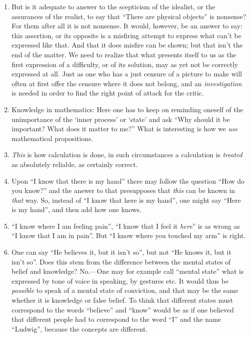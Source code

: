 \documentclass{book}
\begin{document}
\begin{enumerate}
\item
But is it adequate to answer to the scepticism of the idealist, or the
assurances of the realist, to say that ``There are physical objects'' is
nonsense? For them after all it is not nonsense. It would, however, be an
answer to say: this assertion, or its opposite is a misfiring attempt to
express what can't be expressed like that. And that it does misfire can be
shown; but that isn't the end of the matter. We need to realize that what
presents itself to us as the first expression of a difficulty, or of its
solution, may as yet not be correctly expressed at all. Just as one who has a
just censure of a picture to make will often at first offer the censure where
it does not belong, and an \emph{investigation} is needed in order to find the
right point of attack for the critic.

\item
Knowledge in mathematics: Here one has to keep on reminding oneself of the
unimportance of the `inner process' or `state' and ask ``Why should it be
important? What does it matter to me?'' What is interesting is how we
\emph{use} mathematical propositions.

\item
\emph{This} is how calculation is done, in such circumstances a calculation is
\emph{treated} as absolutely reliable, as certainly correct.

\item
Upon ``I know that there is my hand'' there may follow the question ``How do
you know?'' and the answer to that presupposes that \emph{this} can be known in
\emph{that} way. So, instead of ``I know that here is my hand'', one might say
``Here is my hand'', and then add how one knows.

\item
``I know where I am feeling pain'', ``I know that I feel it \emph{here}'' is as
wrong as ``I know that I am in pain''. But ``I know where you touched my arm''
is right.

\item
One can say ``He believes it, but it isn't so'', but not ``He knows it, but it
isn't so''. Does this stem from the difference between the mental states of
belief and knowledge? No.---One may for example call ``mental state'' what is
expressed by tone of voice in speaking, by gestures etc. It would thus be
\emph{possible} to speak of a mental state of conviction, and that may be the
same whether it is knowledge or false belief. To think that different states
must correspond to the words ``believe'' and ``know'' would be as if one
believed that different people had to correspond to the word ``I'' and the name
``Ludwig'', because the concepts are different.


\end{enumerate}
\end{document}
